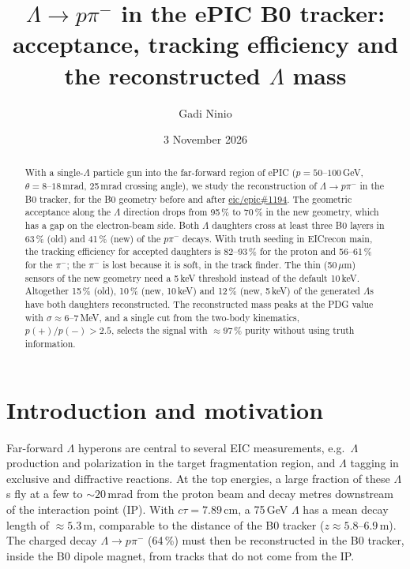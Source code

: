 \documentclass[11pt,a4paper]{article}
\title{$\Lambda \to p\pi^-$ in the ePIC B0 tracker:\\acceptance, tracking efficiency and the reconstructed $\Lambda$ mass}
\author{Gadi Ninio}
\date{3 November 2026}
\begin{document}
\maketitle

\begin{abstract}
With a single-$\Lambda$ particle gun into the far-forward region of ePIC ($p = 50$--$100$\,GeV,
$\theta = 8$--$18$\,mrad, 25\,mrad crossing angle), we study the reconstruction of
$\Lambda \to p\pi^-$ in the B0 tracker, for the B0 geometry before and after
\href{https://github.com/eic/epic/pull/1194}{eic/epic\#1194}. The geometric acceptance along the
$\Lambda$ direction drops from 95\,\% to 70\,\% in the new geometry, which has a gap on the
electron-beam side. Both $\Lambda$ daughters cross at least three B0 layers in 63\,\% (old) and
41\,\% (new) of the $p\pi^-$ decays. With truth seeding in EICrecon main, the tracking efficiency
for accepted daughters is 82--93\,\% for the proton and 56--61\,\% for the $\pi^-$; the $\pi^-$ is
lost because it is soft, in the track finder. The thin (50\,$\mu$m) sensors of the new geometry
need a 5\,keV threshold instead of the default 10\,keV. Altogether 15\,\% (old), 10\,\% (new,
10\,keV) and 12\,\% (new, 5\,keV) of the generated $\Lambda$s have both daughters reconstructed.
The reconstructed mass peaks at the PDG value with $\sigma \approx 6$--$7$\,MeV, and a single cut
from the two-body kinematics, $p(+)/p(-) > 2.5$, selects the signal with $\approx 97$\,\% purity
without using truth information.
\end{abstract}

\tableofcontents
\newpage

\section{Introduction and motivation}

Far-forward $\Lambda$ hyperons are central to several EIC measurements, e.g.\ $\Lambda$
production and polarization in the target fragmentation region, and $\Lambda$ tagging in
exclusive and diffractive reactions. At the top energies, a large fraction of these $\Lambda$s
fly at a few to $\sim 20$\,mrad from the proton beam and decay metres downstream of the
interaction point (IP). With $c\tau = 7.89$\,cm, a 75\,GeV $\Lambda$ has a mean decay length of
$\approx 5.3$\,m, comparable to the distance of the B0 tracker ($z \approx 5.8$--$6.9$\,m).
The charged decay $\Lambda \to p\pi^-$ (64\,\%) must then be reconstructed in the B0 tracker,
inside the B0 dipole magnet, from tracks that do not come from the IP.
\end{document}

